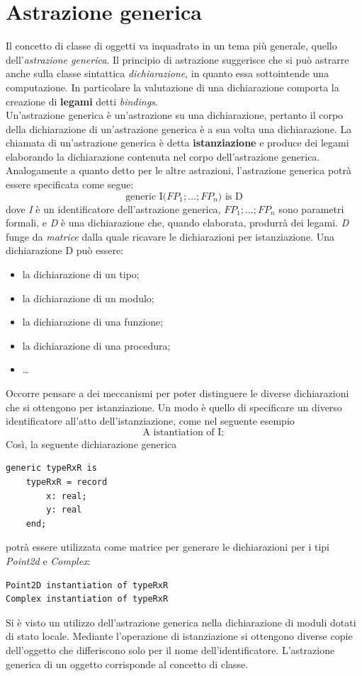 \documentclass[12pt]{report}
\begin{document}
\section{Astrazione generica}
Il concetto di classe di oggetti va inquadrato in un tema più generale, quello dell'\textit{astrazione generica}. Il principio di astrazione suggerisce che si può astrarre anche sulla classe sintattica \textit{dichiarazione}, in quanto essa sottointende una computazione. In particolare la valutazione di una dichiarazione comporta la creazione di \textbf{legami} detti \textit{bindings}. \\
Un'astrazione generica è un'astrazione su una dichiarazione, pertanto il corpo della dichiarazione di un'astrazione generica è a sua volta una dichiarazione. La chiamata di un'astrazione generica è detta \textbf{istanziazione} e produce dei legami elaborando la dichiarazione contenuta nel corpo dell'astrazione generica. \\
Analogamente a quanto detto per le altre astrazioni, l'astrazione generica potrà essere specificata come segue:
\[
\text{generic I($FP_1; \dots; FP_n$) is D}
\]
dove \textit{I} è un identificatore dell'astrazione generica, $FP_1; \dots; FP_n$ sono parametri formali, e \textit{D} è una dichiarazione che, quando elaborata, produrrà dei legami. \textit{D} funge da \textit{matrice} dalla quale ricavare le dichiarazioni per istanziazione. Una dichiarazione D può essere:
\begin{itemize}
	\item la dichiarazione di un tipo;
	\item la dichiarazione di un modulo;
	\item la dichiarazione di una funzione;
	\item la dichiarazione di una procedura;
	\item \dots
\end{itemize}
Occorre pensare a dei meccanismi per poter distinguere le diverse dichiarazioni che si ottengono per istanziazione. Un modo è quello di specificare un diverso identificatore all'atto dell'istanziazione, come nel seguente esempio
\[
\text{A istantiation of I};
\]
Così, la seguente dichiarazione generica
\begin{lstlisting}[style=adastyle]
generic typeRxR is
	typeRxR = record
		x: real;
		y: real
	end;\end{lstlisting}
potrà essere utilizzata come matrice per generare le dichiarazioni per i tipi \textit{Point2d} e \textit{Complex}:
\begin{lstlisting}[style=adastyle]
Point2D instantiation of typeRxR
Complex instantiation of typeRxR\end{lstlisting}
Si è visto un utilizzo dell'astrazione generica nella dichiarazione di moduli dotati di stato locale. Mediante l'operazione di istanziazione si ottengono diverse copie dell'oggetto che differiscono solo per il nome dell'identificatore. L'astrazione generica di un oggetto corrisponde al concetto di classe.
\end{document}
